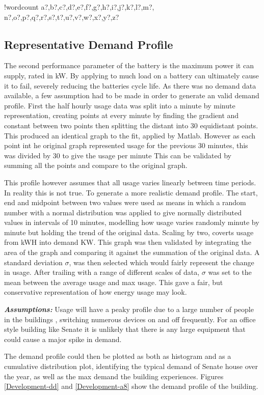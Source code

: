 \documentclass[fontsize=9.5pt]{extarticle}
\numberwithin{figure}{section} %
\newcounter{words}
\newenvironment{counted}{%
  \setcounter{words}{0}
  \SearchList!{wordcount}{\stepcounter{words}}
    {a?,b?,c?,d?,e?,f?,g?,h?,i?,j?,k?,l?,m?,
    n?,o?,p?,q?,r?,s?,t?,u?,v?,w?,x?,y?,z?}
  \UndoBoundary{'}
  \SearchOrder{p;}}{%
  \StopSearching}
\begin{document}
\begin{counted}
\subsection{Representative Demand
Profile}\label{representative-demand-profile}

The second performance parameter of the battery is the maximum power it
can supply, rated in kW. By applying to much load on a battery can
ultimately cause it to fail, severely reducing the batteries cycle life.
As there was no demand data available, a few assumption had to be made
in order to generate an valid demand profile. First the half hourly
usage data was split into a minute by minute representation, creating
points at every minute by finding the gradient and constant between two
points then splitting the distant into 30 equidistant points. This
produced an identical graph to the fit, applied by Matlab. However as
each point int he original graph represented usage for the previous 30
minutes, this was divided by 30 to give the usage per minute This can be
validated by summing all the points and compare to the original graph.

This profile however assumes that all usage varies linearly between time
periods. In reality this is not true. To generate a more realistic
demand profile. The start, end and midpoint between two values were used
as means in which a random number with a normal distribution was applied
to give normally distributed values in intervals of 10 minutes,
modelling how usage varies randomly minute by minute but holding the
trend of the original data. Scaling by two, coverts usage from kWH into
demand KW. This graph was then validated by integrating the area of the
graph and comparing it against the summation of the original data. A
standard deviation \(\sigma\), was then selected which would fairly
represent the change in usage. After trailing with a range of different
scales of data, \(\sigma\) was set to the mean between the average usage
and max usage. This gave a fair, but conservative representation of how
energy usage may look.

\textbf{\emph{Assumptions:}} Usage will have a peaky profile due to a
large number of people in the buildings , switching numerous devices on
and off frequently. For an office style building like Senate it is
unlikely that there is any large equipment that could cause a major
spike in demand.

The demand profile could then be plotted as both as histogram and as a
cumulative distribution plot, identifying the typical demand of Senate
house over the year, as well as the max demand the building experiences.
Figures \ref{Development-dd} and \ref{Development-a8} show the demand
profile of the building.


\end{counted}
\end{document}
